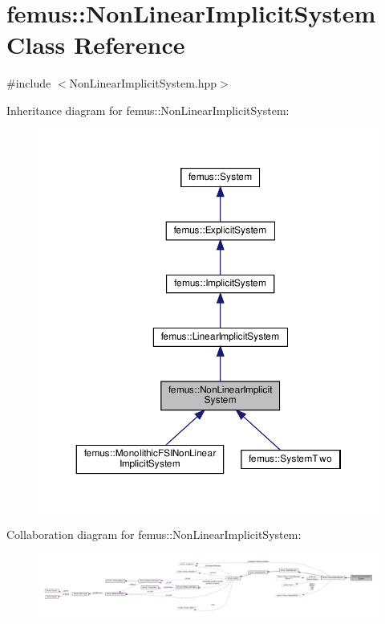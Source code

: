\hypertarget{classfemus_1_1_non_linear_implicit_system}{}\section{femus\+:\+:Non\+Linear\+Implicit\+System Class Reference}
\label{classfemus_1_1_non_linear_implicit_system}


{\ttfamily \#include $<$Non\+Linear\+Implicit\+System.\+hpp$>$}



Inheritance diagram for femus\+:\+:Non\+Linear\+Implicit\+System\+:
\nopagebreak
\begin{figure}[H]
\begin{center}
\leavevmode
\includegraphics[width=350pt]{classfemus_1_1_non_linear_implicit_system__inherit__graph}
\end{center}
\end{figure}


Collaboration diagram for femus\+:\+:Non\+Linear\+Implicit\+System\+:
\nopagebreak
\begin{figure}[H]
\begin{center}
\leavevmode
\includegraphics[width=350pt]{classfemus_1_1_non_linear_implicit_system__coll__graph}
\end{center}
\end{figure}
